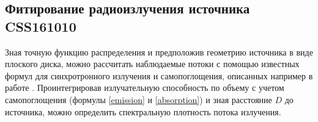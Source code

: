 

\subsection{Фитирование радиоизлучения источника CSS161010}

Зная точную функцию распределения и предположив геометрию источника в виде плоского диска, можно рассчитать наблюдаемые потоки с помощью известных формул для синхротронного излучения и самопоглощения, описанных например в работе \cite{Ghisellini}. 
Проинтегрировав излучательную способность по объему с учетом самопоглощения (формулы \ref{emission} и \ref{absorption}) и зная расстояние $\displaystyle D$ до источника, можно определить спектральную плотность потока излучения.

